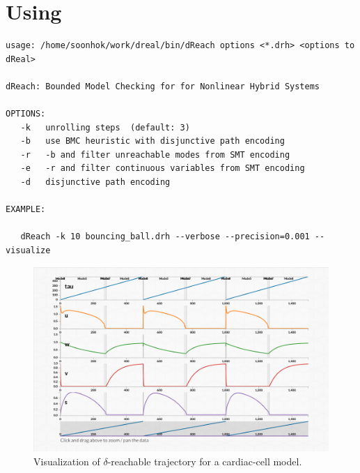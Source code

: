 \section{Using \dReach{}}

  \begin{Verbatim}[fontfamily=courier, frame=single, framesep=1mm, fontsize=\scriptsize]
usage: /home/soonhok/work/dreal/bin/dReach options <*.drh> <options to dReal>

dReach: Bounded Model Checking for for Nonlinear Hybrid Systems

OPTIONS:
   -k   unrolling steps  (default: 3)
   -b   use BMC heuristic with disjunctive path encoding
   -r   -b and filter unreachable modes from SMT encoding
   -e   -r and filter continuous variables from SMT encoding
   -d   disjunctive path encoding

EXAMPLE:

   dReach -k 10 bouncing_ball.drh --verbose --precision=0.001 --visualize

\end{Verbatim}

\begin{figure}
  \centering
  \includegraphics[width=\textwidth]{images/cardiac}
  \caption{Visualization of $\delta$-reachable trajectory for
    a cardiac-cell model.}
  \label{fig:viz}
\end{figure}


